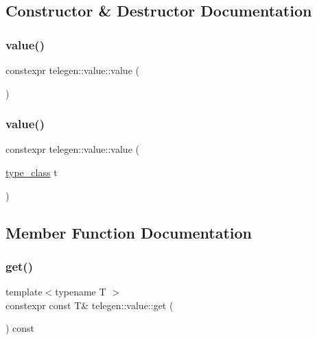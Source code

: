 \subsection{Constructor \& Destructor Documentation}
\mbox{\label{classtelegen_1_1value_aa2c76dda3f9812dd9a031a0b463a6f5c}} 
\subsubsection{\texorpdfstring{value()}{value()}\hspace{0.1cm}{\footnotesize\ttfamily [1/2]}}
{\footnotesize\ttfamily constexpr telegen\+::value\+::value (\begin{DoxyParamCaption}{ }\end{DoxyParamCaption})\hspace{0.3cm}{\ttfamily [inline]}}

\mbox{\label{classtelegen_1_1value_a7e501fb7a6f3b724255b88572a76d073}} 
\subsubsection{\texorpdfstring{value()}{value()}\hspace{0.1cm}{\footnotesize\ttfamily [2/2]}}
{\footnotesize\ttfamily constexpr telegen\+::value\+::value (\begin{DoxyParamCaption}\item[{\hyperlink{namespacetelegen_a72d4e69f0be1731e1a851a96dec858d8}{type\+\_\+class}}]{t }\end{DoxyParamCaption})\hspace{0.3cm}{\ttfamily [inline]}}



\subsection{Member Function Documentation}
\mbox{\label{classtelegen_1_1value_a4bcd8e8317c0395b523596e4c0fa180d}} 
\subsubsection{\texorpdfstring{get()}{get()}\hspace{0.1cm}{\footnotesize\ttfamily [1/2]}}
{\footnotesize\ttfamily template$<$typename T $>$ \\
constexpr const T\& telegen\+::value\+::get (\begin{DoxyParamCaption}{ }\end{DoxyParamCaption}) const\hspace{0.3cm}{\ttfamily [inline]}}

